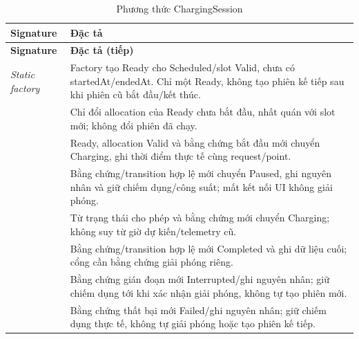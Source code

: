 \begin{longtable}{|L{58mm}|L{81mm}|}
\caption{Phương thức ChargingSession}\\\hline
\textbf{Signature} & \textbf{Đặc tả}\\\hline
\endfirsthead
\hline\textbf{Signature} & \textbf{Đặc tả (tiếp)}\\\hline\endhead
\textit{Static factory}\par {} & Factory tạo Ready cho Scheduled/slot Valid, chưa có startedAt/endedAt. Chỉ một Ready, không tạo phiên kế tiếp sau khi phiên cũ bắt đầu/kết thúc.\\\hline
{} & Chỉ đổi allocation của Ready chưa bắt đầu, nhất quán với slot mới; không đổi phiên đã chạy.\\\hline
{} & Ready, allocation Valid và bằng chứng bắt đầu mới chuyển Charging, ghi thời điểm thực tế cùng request/point.\\\hline
{} & Bằng chứng/transition hợp lệ mới chuyển Paused, ghi nguyên nhân và giữ chiếm dụng/công suất; mất kết nối UI không giải phóng.\\\hline
{} & Từ trạng thái cho phép và bằng chứng mới chuyển Charging; không suy từ giờ dự kiến/telemetry cũ.\\\hline
{} & Bằng chứng/transition hợp lệ mới Completed và ghi dữ liệu cuối; cổng cần bằng chứng giải phóng riêng.\\\hline
{} & Bằng chứng gián đoạn mới Interrupted/ghi nguyên nhân; giữ chiếm dụng tới khi xác nhận giải phóng, không tự tạo phiên mới.\\\hline
{} & Bằng chứng thất bại mới Failed/ghi nguyên nhân; giữ chiếm dụng thực tế, không tự giải phóng hoặc tạo phiên kế tiếp.\\\hline
\end{longtable}


